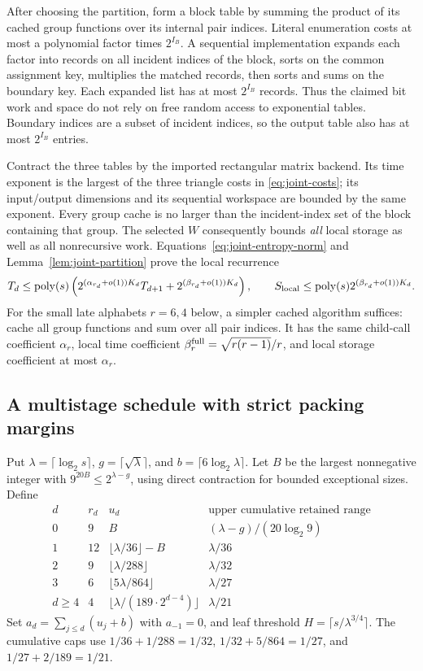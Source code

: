 After choosing the partition, form a block table by summing the product
of its cached group functions over its internal pair indices.  Literal
enumeration costs at most a polynomial factor times $2^{I_B}$.
A sequential implementation expands each factor into records on all
incident indices of the block, sorts on the common assignment key,
multiplies the matched records, then sorts and sums on the boundary
key.  Each expanded list has at most $2^{I_B}$ records.  Thus the
claimed bit work and space do not rely on free random access to
exponential tables.  Boundary indices are a subset of incident indices,
so the output table also has at most $2^{I_B}$ entries.

Contract the three tables by the imported rectangular matrix backend.
Its time exponent is the largest of the three triangle costs in
\eqref{eq:joint-costs}; its input/output dimensions and its sequential
workspace are bounded by the same exponent.  Every group cache is no
larger than the incident-index set of the block containing that group.
The selected $W$ consequently bounds \emph{all} local storage as well
as all nonrecursive work.  Equations~\eqref{eq:joint-entropy-norm} and
Lemma~\ref{lem:joint-partition} prove the local recurrence
\begin{equation}\label{eq:joint-recurrence}
 T_d\le\operatorname{poly}(s)\left(
  2^{(\alpha_{r_d}+o(1))K_d}T_{d+1}
       +2^{(\beta_{r_d}+o(1))K_d}\right),
 \qquad S_{\rm local}\le\operatorname{poly}(s)2^{(\beta_{r_d}+o(1))K_d}.
\end{equation}
For the small late alphabets $r=6,4$ below, a simpler cached algorithm
suffices: cache all group functions and sum over all pair indices.
It has the same child-call coefficient $\alpha_r$, local time
coefficient $\beta_r^{\rm full}=\sqrt{r(r-1)}/r$, and local storage
coefficient at most $\alpha_r$.

\subsection{A multistage schedule with strict packing margins}
Put $\lambda=\lceil\log_2s\rceil$,
$g=\lceil\sqrt\lambda\rceil$, and
$b=\lceil6\log_2\lambda\rceil$.  Let $B$ be the largest nonnegative
integer with $9^{20B}\le2^{\lambda-g}$, using direct contraction for
bounded exceptional sizes.  Define
\[
\begin{array}{c|c|c|c}
 d&r_d&u_d&\text{upper cumulative retained range}\\\hline
 0&9&B&(\lambda-g)/(20\log_2 9)\\
 1&12&\lfloor\lambda/36\rfloor-B&\lambda/36\\
 2&9&\lfloor\lambda/288\rfloor&\lambda/32\\
 3&6&\lfloor5\lambda/864\rfloor&\lambda/27\\
 d\ge4&4&\lfloor\lambda/(189\cdot2^{d-4})\rfloor&\lambda/21
\end{array}
\]
Set $a_d=\sum_{j\le d}(u_j+b)$ with $a_{-1}=0$, and leaf threshold
$H=\lceil s/\lambda^{3/4}\rceil$.
The cumulative caps use
$1/36+1/288=1/32$,
$1/32+5/864=1/27$, and $1/27+2/189=1/21$.

